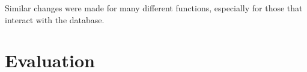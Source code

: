 \documentclass{paper}
\begin{document}




Similar changes were made for many different functions, especially for those that interact with the database.

\section{Evaluation}
\label{sec:eval}


\label{mylastpage}
\newpage
\thispagestyle{frontorback}

\newpage
\listoffigures
\vspace{1cm}
\listofsnippets
\vspace{1cm}
{}
\printbibliography
\thispagestyle{frontorback}
\end{document}
